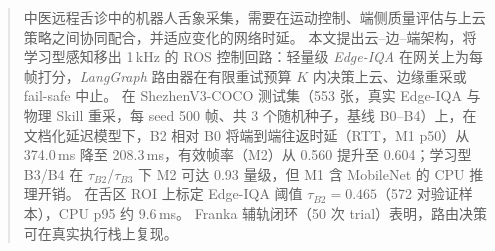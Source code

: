 \begin{abstract}
中医远程舌诊中的机器人舌象采集，需要在运动控制、端侧质量评估与上云策略之间协同配合，并适应变化的网络时延。
本文提出云--边--端架构，将学习型感知移出 1\,kHz 的 ROS 控制回路：轻量级 \emph{Edge-IQA} 在网关上为每帧打分，\emph{LangGraph} 路由器在有限重试预算 $K$ 内决策上云、边缘重采或 fail-safe 中止。
在 ShezhenV3-COCO 测试集（553 张，真实 Edge-IQA 与物理 Skill 重采，每 seed 500 帧、共 3 个随机种子，基线 B0--B4）上，在文档化延迟模型下，B2 相对 B0 将端到端往返时延（RTT，M1 p50）从 374.0\,ms 降至 208.3\,ms，有效帧率（M2）从 0.560 提升至 0.604；学习型 B3/B4 在 $\tau_{B2}$/$\tau_{B3}$ 下 M2 可达 0.93 量级，但 M1 含 MobileNet 的 CPU 推理开销。
在舌区 ROI 上标定 Edge-IQA 阈值 $\tau_{B2}{=}0.465$（572 对验证样本），CPU p95 约 9.6\,ms。
Franka 辅轨闭环（50 次 trial）表明，路由决策可在真实执行栈上复现。
\end{abstract}

